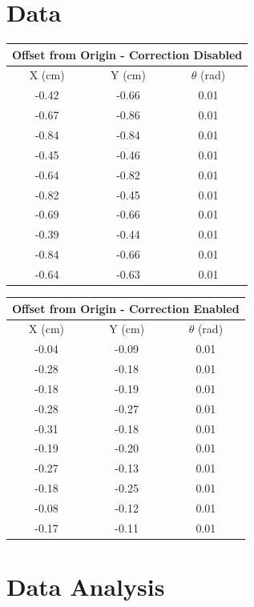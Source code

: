 \documentclass[11pt]{article} %
\begin{document}
\section{Data}
\begin{center}
\begin{tabular}{ | c | c | c | }
\multicolumn{3}{c}{Offset from Origin - Correction Disabled} \\ \hline
X (cm) & Y (cm) & $\theta$ (rad)\\ \hline
-0.42 & -0.66 & 0.01 \\ \hline
-0.67 & -0.86 & 0.01 \\ \hline
-0.84 & -0.84 & 0.01 \\ \hline
-0.45 & -0.46 & 0.01 \\ \hline
-0.64 & -0.82 & 0.01 \\ \hline
-0.82 & -0.45 & 0.01 \\ \hline
-0.69 & -0.66 & 0.01 \\ \hline
-0.39 & -0.44 & 0.01 \\ \hline
-0.84 & -0.66 & 0.01 \\ \hline
-0.64 & -0.63 & 0.01 \\ \hline
\end{tabular}
\end{center}

\begin{center}
\begin{tabular}{ | c | c | c | }
\multicolumn{3}{c}{Offset from Origin - Correction Enabled} \\ \hline
X (cm) & Y (cm) & $\theta$ (rad)\\ \hline
-0.04 & -0.09 & 0.01 \\ \hline
-0.28 & -0.18 & 0.01 \\ \hline
-0.18 & -0.19 & 0.01 \\ \hline
-0.28 & -0.27 & 0.01 \\ \hline
-0.31 & -0.18 & 0.01 \\ \hline
-0.19 & -0.20 & 0.01 \\ \hline
-0.27 & -0.13 & 0.01 \\ \hline
-0.18 & -0.25 & 0.01 \\ \hline
-0.08 & -0.12 & 0.01 \\ \hline
-0.17 & -0.11 & 0.01 \\ \hline
\end{tabular}
\end{center}

\section{Data Analysis}
\end{document}
